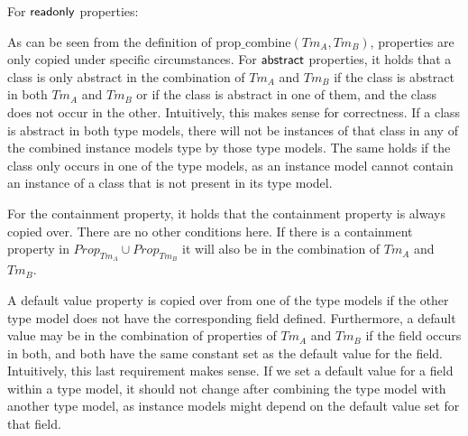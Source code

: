 \begin{defin}
For $\mathsf{readonly}$ properties:
\end{defin}

As can be seen from the definition of $\mathrm{prop\_\!combine}(Tm_A, Tm_B)$, properties are only copied under specific circumstances. For $\mathsf{abstract}$ properties, it holds that a class is only abstract in the combination of $Tm_A$ and $Tm_B$ if the class is abstract in both $Tm_A$ and $Tm_B$ or if the class is abstract in one of them, and the class does not occur in the other. Intuitively, this makes sense for correctness. If a class is abstract in both type models, there will not be instances of that class in any of the combined instance models type by those type models. The same holds if the class only occurs in one of the type models, as an instance model cannot contain an instance of a class that is not present in its type model.

For the containment property, it holds that the containment property is always copied over. There are no other conditions here. If there is a containment property in $Prop_{Tm_A} \cup Prop_{Tm_B}$ it will also be in the combination of $Tm_A$ and $Tm_B$.

A default value property is copied over from one of the type models if the other type model does not have the corresponding field defined. Furthermore, a default value may be in the combination of properties of $Tm_A$ and $Tm_B$ if the field occurs in both, and both have the same constant set as the default value for the field. Intuitively, this last requirement makes sense. If we set a default value for a field within a type model, it should not change after combining the type model with another type model, as instance models might depend on the default value set for that field.

